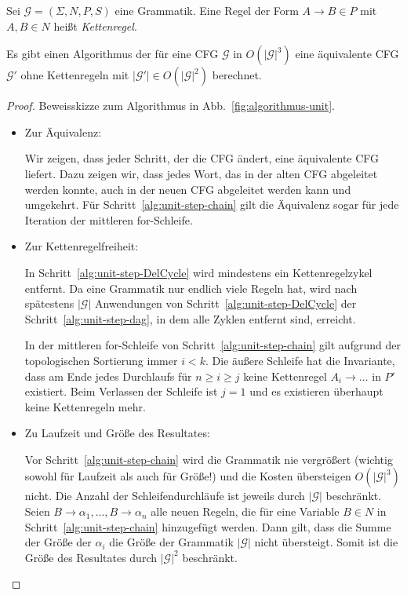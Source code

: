 \begin{Def}
  Sei $\mathcal{G} = (\Sigma, N, P, S)$ eine Grammatik.
  Eine Regel der Form $A \to B \in P$ mit $A, B \in N$ heißt \emph{Kettenregel}.
\end{Def}

\begin{lemma}
Es gibt einen Algorithmus der für eine \ac{CFG} $\mathcal{G}$ in
$O(|\mathcal{G}|^3)$ eine äquivalente \ac{CFG} $\mathcal{G}'$ ohne
Kettenregeln mit $|\mathcal{G}'|\in O(|\mathcal{G}|^2)$ berechnet. 
\end{lemma}
\begin{proof} Beweisskizze zum Algorithmus in Abb.~\ref{fig:algorithmus-unit}.
  \begin{itemize}
  \item Zur Äquivalenz:
    
    Wir zeigen, dass jeder Schritt, der die \ac{CFG} ändert, eine
    äquivalente \ac{CFG} liefert. 
    Dazu zeigen wir, dass jedes Wort, das in der alten \ac{CFG}
    abgeleitet werden konnte, auch in der neuen \ac{CFG}
    abgeleitet werden kann und umgekehrt. 
    Für Schritt~\ref{alg:unit-step-chain} gilt die
    Äquivalenz sogar für jede Iteration der mittleren for-Schleife. 
    
  \item Zur Kettenregelfreiheit:
    
    In Schritt~\ref{alg:unit-step-DelCycle} wird mindestens ein
    Kettenregelzykel entfernt. Da eine Grammatik nur endlich viele
    Regeln hat, wird nach spätestens $|\mathcal{G}|$ Anwendungen von
    Schritt~\ref{alg:unit-step-DelCycle} der
    Schritt~\ref{alg:unit-step-dag}, in dem alle Zyklen entfernt sind,
    erreicht. 
	
    In der mittleren for-Schleife von
    Schritt~\ref{alg:unit-step-chain} gilt aufgrund der topologischen
    Sortierung immer $i<k$.  Die äußere Schleife hat die Invariante,
    dass am Ende jedes Durchlaufs für $n \ge i \ge j$ keine
    Kettenregel $A_i \to \ldots$ in $P'$ existiert.  Beim Verlassen
    der Schleife ist $j = 1$ und es existieren überhaupt keine
    Kettenregeln mehr.
	
  \item Zu Laufzeit und Größe des Resultates:
	
    Vor Schritt~\ref{alg:unit-step-chain} wird die Grammatik nie
    vergrößert (wichtig sowohl für Laufzeit als auch für Größe!) und
    die Kosten übersteigen $O(|\mathcal{G}|^3)$ nicht.  Die Anzahl der
    Schleifendurchläufe ist jeweils durch $|\mathcal{G}|$ beschränkt.
    Seien $B \to \alpha_1, \ldots, B \to \alpha_n$ alle neuen
    Regeln, die für eine Variable $B\in N$ in
    Schritt~\ref{alg:unit-step-chain} hinzugefügt werden.  Dann gilt,
    dass die Summe der Größe der $\alpha_i$ die Größe der Grammatik
    $|\mathcal{G}|$ nicht übersteigt.  Somit ist die Größe des
    Resultates durch $|\mathcal{G}|^2$ beschränkt.  \qedhere
  \end{itemize}
\end{proof}

